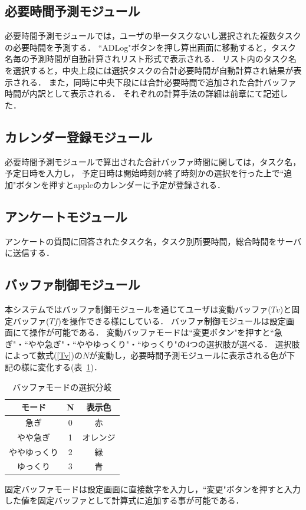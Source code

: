 \subsection{必要時間予測モジュール}
必要時間予測モジュールでは，ユーザの単一タスクないし選択された複数タスクの必要時間を予測する．
``ADLog"ボタンを押し算出画面に移動すると，タスク名毎の予測時間が自動計算されリスト形式で表示される．
リスト内のタスク名を選択すると，中央上段には選択タスクの合計必要時間が自動計算され結果が表示される．
また，同時に中央下段には合計必要時間で追加された合計バッファ時間が内訳として表示される．
それぞれの計算手法の詳細は前章にて記述した．

\subsection{カレンダー登録モジュール}
必要時間予測モジュールで算出された合計バッファ時間に関しては，タスク名，予定日時を入力し，
予定日時は開始時刻か終了時刻かの選択を行った上で``追加"ボタンを押すとappleのカレンダーに予定が登録される．

\subsection{アンケートモジュール}
アンケートの質問に回答されたタスク名，タスク別所要時間，総合時間をサーバに送信する．

\subsection{バッファ制御モジュール}
本システムではバッファ制御モジュールを通じてユーザは変動バッファ($Tv$)と固定バッファ($Tf$)を操作できる様にしている．
バッファ制御モジュールは設定画面にて操作が可能である．
変動バッファモードは``変更ボタン"を押すと``急ぎ"・``やや急ぎ"・``ややゆっくり"・``ゆっくり"の4つの選択肢が選べる．
選択肢によって数式(\ref{Tv})の$N$が変動し，必要時間予測モジュールに表示される色が下記の様に変化する(表~\ref{tb:buffer})．
\begin{table}[htb]
  \begin{center}
  \begin{tabular}{|c|c|c|} \hline
    モード & N & 表示色  \\ \hline \hline
    急ぎ & 0 & 赤  \\ \hline
    やや急ぎ & 1 & オレンジ  \\ \hline
    ややゆっくり & 2 & 緑  \\ \hline
    ゆっくり & 3 & 青  \\ \hline
  \end{tabular}
    \caption{バッファモードの選択分岐}
    \label{tb:buffer}
  \end{center}
\end{table}
固定バッファモードは設定画面に直接数字を入力し，``変更"ボタンを押すと入力した値を固定バッファとして計算式に追加する事が可能である．

